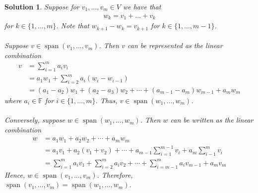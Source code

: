 \documentclass[12pt]{article}
\newcommand{\F}{\mathbb{F}}
\DeclareMathOperator{\spn}{span}
\theoremstyle{problem}
\newtheorem{sol}{Solution}
\theoremstyle{remark}
\begin{document}
\begin{sol}
    Suppose for $v_1,\ldots,v_m \in V$ we have that 
    \begin{align*}
        w_k = v_1+\ldots+v_k
    \end{align*}
    for $k \in \{1,\ldots ,m\}$. Note that $w_{k+1}-w_k = v_{k+1}$ for $k \in \{1,\ldots, m-1\}$. \\ \\
    Suppose $v \in \spn(v_1,\ldots,v_m)$. Then $v$ can be represented as the linear combination
    \begin{align*}
        v  &= \sum_{i=1}^{m}a_iv_i \\
       &=a_1w_1+\sum_{i=2} ^ma_i(w_i-w_{i-1})\\
       &= (a_1-a_2)w_1 + (a_2-a_3)w_2 +\cdots+(a_{m-1}-a_m)w_{m-1} + a_mw_m
    \end{align*}
    where $a_i \in \F$ for $i \in \{1,\ldots, m\}$. Thus, $v \in \spn(w_1,\ldots,w_m)$. \\ \\
    Conversely, suppose $w \in \spn(w_1,\ldots,w_m)$. Then $w$ can be written as the linear combination
    \begin{align*}
        w &= a_1w_1 + a_2w_2 + \cdots + a_mw_m \\
        &= a_1v_1 + a_2(v_1+v_2) + \cdots + a_{m-1}\sum_{i=1}^{m-1}v_i + a_m\sum_{i-1}^{m}v_i \\
        &= \sum_{i=1}^{m}a_iv_1 +\sum_{i=2}^{m}a_iv_2 + \cdots + \sum_{i=m-1}^{m}a_iv_{m-1} + a_mv_m
    \end{align*}
    Hence, $w \in \spn(v_1, \ldots , v_m)$. Therefore, $\spn(v_1,\ldots,v_m)= \spn(w_1,\ldots,w_m)$.
\end{sol}
\end{document}
